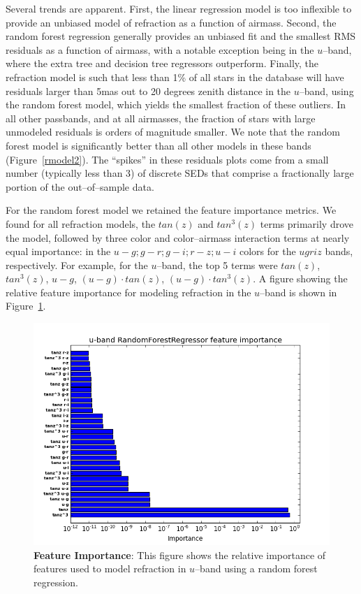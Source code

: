 \documentclass[DM,toc]{lsstdoc}
\begin{document}
Several trends are apparent.  First, the linear regression model is
too inflexible to provide an unbiased model of refraction as a
function of airmass.  Second, the random forest regression generally
provides an unbiased fit and the smallest RMS residuals as a function
of airmass, with a notable exception being in the $u$--band, where the
extra tree and decision tree regressors outperform.  Finally, the
refraction model is such that less than 1\% of all stars in the
database will have residuals larger than 5mas out to 20 degrees zenith
distance in the $u$--band, using the random forest model, which yields
the smallest fraction of these outliers.  In all other passbands, and
at all airmasses, the fraction of stars with large unmodeled residuals
is orders of magnitude smaller.  We note that the random forest model
is significantly better than all other models in these bands
(Figure~\ref{rmodel2}).  The ``spikes'' in these residuals plots come
from a small number (typically less than 3) of discrete SEDs that
comprise a fractionally large portion of the out--of--sample data.

For the random forest model we retained the feature importance
metrics.  We found for all refraction models, the $tan(z)$ and
$tan^3(z)$ terms primarily drove the model, followed by three color
and color--airmass interaction terms at nearly equal importance: in
the $u-g; g-r; g-i; r-z; u-i$ colors for the $ugriz$ bands,
respectively.  For example, for the $u$--band, the top 5 terms were
$tan(z)$, $tan^3(z)$, $u-g$, $(u-g) \cdot tan(z)$, $(u-g) \cdot
tan^3(z)$.  A figure showing the relative feature importance for
modeling refraction in the $u$--band is shown in
Figure~\ref{fig:feat}.

\begin{figure}[!t]
  \centering
  \includegraphics[width=1.1\textwidth]{R_u_A_50_rfr.png}
  \caption{\textbf{Feature Importance}: This figure shows the relative
    importance of features used to model refraction in $u$--band using
    a random forest regression.}
  \label{fig:feat}
\end{figure}
\end{document}
